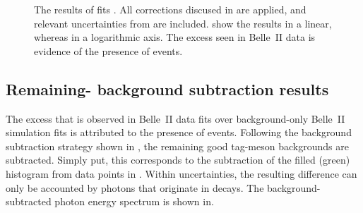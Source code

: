 \begin{figure}[htbp!]
    \centering
    \caption{\label{fig:final_fit_results}
        The results of fits .
        All corrections discused in  are applied, 
        and relevant uncertainties from  are included.
         show the results in a linear, whereas  in a logarithmic axis.
        The excess seen in Belle~II data is evidence of the presence of \BtoXsdgamma events.
    }
\end{figure}

\subsection{Remaining-\texorpdfstring{\BB}{BB} background subtraction results}\label{sec:background_subtraction_results}

The excess that is observed in Belle~II data fits over background-only Belle~II simulation fits is attributed to the presence of \BtoXsdgamma events.
Following the background subtraction strategy shown in ,
the remaining good tag-\B meson backgrounds are subtracted.
Simply put, this corresponds to the subtraction of the filled (green) histogram from data points in .
Within uncertainties, the resulting difference can only be accounted by photons that originate in \BtoXsdgamma decays.
The background-subtracted photon energy spectrum is shown in.